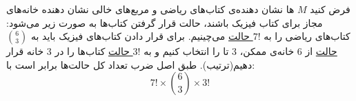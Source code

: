 \p
فرض کنید
 $M$
 ‌ها نشان دهنده‌ی کتاب‌های ریاضی و مربع‌های خالی نشان دهنده خانه‌های مجاز برای کتاب فیزیک باشند، حالت قرار گرفتن کتاب‌ها به صورت زیر می‌شود:
 کتاب‌های ریاضی را به
\underline{$7!$ حالت}
 می‌چینیم.
 برای قرار دادن کتاب‌های فیزیک باید به
 \underline{$\binom{6}{3}$ حالت}
‌از 6 خانه‌ی ممکن، 3 تا را انتخاب کنیم
و به
\underline{$3!$ حالت}
کتاب‌ها را در 3 خانه قرار دهیم(ترتیب).
طبق اصل ضرب تعداد کل حالت‌ها برابر است با:
$$7! \times \binom{6}{3} \times 3!$$